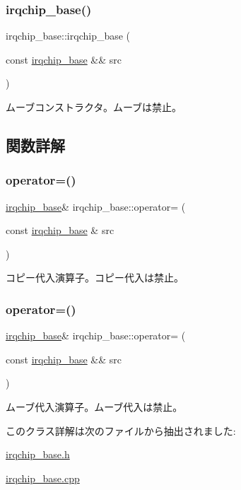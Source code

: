 \subsubsection{\texorpdfstring{irqchip\+\_\+base()}{irqchip\_base()}\hspace{0.1cm}{\footnotesize\ttfamily [3/3]}}
{\footnotesize\ttfamily irqchip\+\_\+base\+::irqchip\+\_\+base (\begin{DoxyParamCaption}\item[{const \hyperlink{classirqchip__base}{irqchip\+\_\+base} \&\&}]{src }\end{DoxyParamCaption})\hspace{0.3cm}{\ttfamily [delete]}}

ムーブコンストラクタ。ムーブは禁止。 

\subsection{関数詳解}
\hypertarget{classirqchip__base_ae8f56c199cebbea51ec901f316e29670}{}\label{classirqchip__base_ae8f56c199cebbea51ec901f316e29670} 
\subsubsection{\texorpdfstring{operator=()}{operator=()}\hspace{0.1cm}{\footnotesize\ttfamily [1/2]}}
{\footnotesize\ttfamily \hyperlink{classirqchip__base}{irqchip\+\_\+base}\& irqchip\+\_\+base\+::operator= (\begin{DoxyParamCaption}\item[{const \hyperlink{classirqchip__base}{irqchip\+\_\+base} \&}]{src }\end{DoxyParamCaption})\hspace{0.3cm}{\ttfamily [delete]}}

コピー代入演算子。コピー代入は禁止。 \hypertarget{classirqchip__base_aa16599b249ba6e54427abca666d66c00}{}\label{classirqchip__base_aa16599b249ba6e54427abca666d66c00} 
\subsubsection{\texorpdfstring{operator=()}{operator=()}\hspace{0.1cm}{\footnotesize\ttfamily [2/2]}}
{\footnotesize\ttfamily \hyperlink{classirqchip__base}{irqchip\+\_\+base}\& irqchip\+\_\+base\+::operator= (\begin{DoxyParamCaption}\item[{const \hyperlink{classirqchip__base}{irqchip\+\_\+base} \&\&}]{src }\end{DoxyParamCaption})\hspace{0.3cm}{\ttfamily [delete]}}

ムーブ代入演算子。ムーブ代入は禁止。 

このクラス詳解は次のファイルから抽出されました\+:\begin{DoxyCompactItemize}
\item 
\hyperlink{irqchip__base_8h}{irqchip\+\_\+base.\+h}\item 
\hyperlink{irqchip__base_8cpp}{irqchip\+\_\+base.\+cpp}\end{DoxyCompactItemize}
